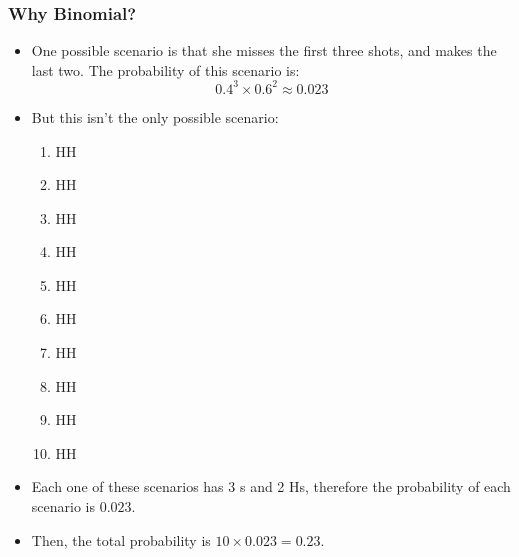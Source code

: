 \documentclass[11pt,containsverbatim,handout,xcolor=xelatex,dvipsnames,table]{beamer}
\begin{document}
\begin{frame}
\frametitle{Why Binomial?}


\pause

\begin{itemize}

\item One possible scenario is that she misses the first three shots, and makes the last two. The probability of this scenario is:
\[ 0.4^3 \times 0.6^2 \approx 0.023 \]

\pause

\item But this isn't the only possible scenario:
\vspace{-0.25cm}
\begin{changemargin}{-1.5cm}{0cm} 
\begin{multicols}{5}
\begin{enumerate}[1.]
\item {}HH
\item {}HH
\item {}HH
\item HH
\item HH
\item HH
\item HH
\item {}HH
\item {}HH
\item {}HH
\end{enumerate}
\end{multicols}
\end{changemargin}

\pause

\item Each one of these scenarios has 3 s and 2 Hs, therefore the probability of each scenario is $0.023$.

\pause

\item Then, the total probability is $10 \times 0.023 = 0.23$.

\end{itemize}

\end{frame}
\end{document}
